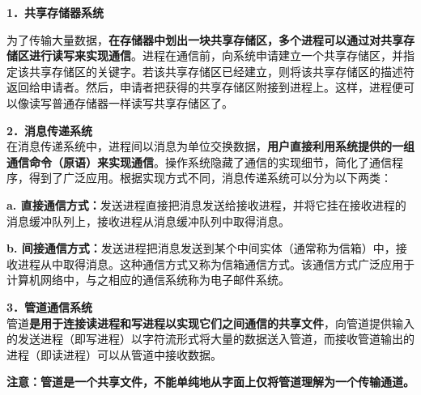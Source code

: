 \textbf{{1．共享存储器系统}}

为了传输大量数据，\textbf{{在存储器中划出一块共享存储区，多个进程可以通过对共享存储区进行读写来实现通信}}。进程在通信前，向系统申请建立一个共享存储区，并指定该共享存储区的关键字。若该共享存储区已经建立，则将该共享存储区的描述符返回给申请者。然后，申请者把获得的共享存储区附接到进程上。这样，进程便可以像读写普通存储器一样读写共享存储区了。

\textbf{{2．消息传递系统}}\\

在消息传递系统中，进程间以消息为单位交换数据，\textbf{{用户直接利用系统提供的一组通信命令（原语）来实现通信}}。操作系统隐藏了通信的实现细节，简化了通信程序，得到了广泛应用。根据实现方式不同，消息传递系统可以分为以下两类：

\textbf{a.
直接通信方式：}发送进程直接把消息发送给接收进程，并将它挂在接收进程的消息缓冲队列上，接收进程从消息缓冲队列中取得消息。

\textbf{b.
间接通信方式：}发送进程把消息发送到某个中间实体（通常称为信箱）中，接收进程从中取得消息。这种通信方式又称为信箱通信方式。该通信方式广泛应用于计算机网络中，与之相应的通信系统称为电子邮件系统。

\textbf{{3．管道通信系统}}\\

管道{\textbf{是用于连接读进程和写进程以实现它们之间通信的}}{\textbf{共享文件}}，向管道提供输入的发送进程（即写进程）以字符流形式将大量的数据送入管道，而接收管道输出的进程（即读进程）可以从管道中接收数据。

\textbf{注意：管道是一个共享文件，不能单纯地从字面上仅将管道理解为一个传输通道。}
